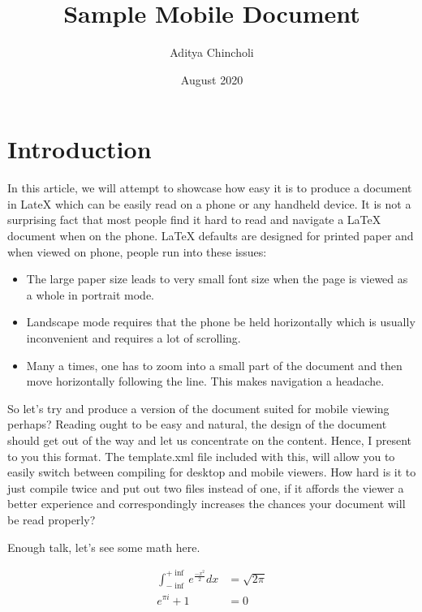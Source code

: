 \documentclass[12pt]{article}
\title{Sample Mobile Document}
\author{Aditya Chincholi}
\date{August 2020}
\begin{document}
\renewcommand{\familydefault}{\sfdefault}

\sloppy

\maketitle
\pagebreak

\section{Introduction}
In this article, we will attempt to showcase how easy it is to
produce a document in LateX which can be easily read on a phone
or any handheld device. It is not a surprising fact that most
people find it hard to read and navigate a LaTeX document when on
the phone. LaTeX defaults are designed for printed paper and when
viewed on phone, people run into these issues:

\begin{itemize}
	\item The large paper size leads to very small font size when
	the page is viewed as a whole in portrait mode.
	\item Landscape mode requires that the phone be held horizontally
	which is usually inconvenient and requires a lot of scrolling.
	\item Many a times, one has to zoom into a small part of the
	document and then move horizontally following the line. This
	makes navigation a headache.
\end{itemize}

So let's try and produce a version of the document suited for mobile
viewing perhaps? Reading ought to be easy and natural, the design of
the document should get out of the way and let us concentrate on the
content. Hence, I present to you this format. The template.xml file
included with this, will allow you to easily switch between compiling
for desktop and mobile viewers. How hard is it to just compile twice
and put out two files instead of one, if it affords the viewer a
better experience and correspondingly increases the chances your
document will be read properly?

Enough talk, let's see some math here.

\begin{align*}
	\int_{-\inf}^{+\inf} e^{\frac{-x^2}{2}} dx &= \sqrt{2\pi} \\
	e^{\pi i} + 1 &= 0
\end{align*}
\end{document}

